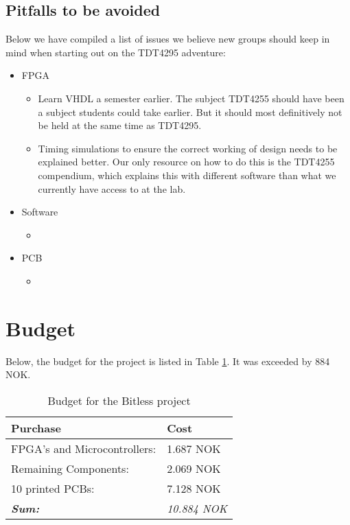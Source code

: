 \subsection{Pitfalls to be avoided}\label{conclusion:pitfalls}
Below we have compiled a list of issues we believe new groups should keep in mind when starting out on the TDT4295 adventure:
\begin{itemize}
	\item FPGA
	\begin{itemize}
		\item Learn VHDL a semester earlier. The subject TDT4255 should have been a subject students could take earlier.
But it should most definitively not be held at the same time as TDT4295.
		\item Timing simulations to ensure the correct working of design needs to be explained better.
Our only resource on how to do this is the TDT4255 compendium\cite{tdt4255-compendium}, which explains this with different software than what we currently have access to at the lab.
	\end{itemize}
	\item Software
	\begin{itemize}
		\item
	\end{itemize}
	\item PCB
	\begin{itemize}
		\item
	\end{itemize}
\end{itemize}

\section{Budget}

Below, the budget for the project is listed in Table \ref{tab:budget}. It was
exceeded by 884 NOK.

\begin{table}[H]
	\centering
	\begin{tabular}{|l|l|}
		\hline
		\textbf{Purchase} & \textbf{Cost} \\
		\hline
		\hline
		FPGA's and Microcontrollers: & 1.687 NOK\\
		\hline
		Remaining Components: & 2.069 NOK\\
		\hline
		10 printed PCBs: & 7.128 NOK \\
		\hline
		\hline
		\textbf{\textit{Sum:}} & \textit{10.884 NOK}\\
		\hline
	\end{tabular}
	\caption{Budget for the Bitless project}
	\label{tab:budget}
\end{table}
